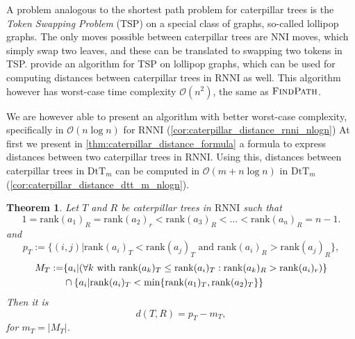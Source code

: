 \documentclass[11pt]{amsart}
\newtheorem{theorem}{Theorem}
\newcommand{\rnni}{\mathrm{RNNI}}
\newcommand{\findpath}{\textsc{FindPath}}
\newcommand{\rank}{\mathrm{rank}}
\newcommand{\nni}{\mathrm{NNI}}
\newcommand{\dtt}{\mathrm{DtT}}
\renewcommand{\O}{\mathcal O}
\begin{document}
A problem analogous to the shortest path problem for caterpillar trees is the \emph{Token Swapping Problem} (TSP) \autocite{Kawahara2017-ey} on a special class of graphs, so-called lollipop graphs.
The only moves possible between caterpillar trees are $\nni$ moves, which simply swap two leaves, and these can be translated to swapping two tokens in TSP.
\textcite{Kawahara2017-ey} provide an algorithm for TSP on lollipop graphs, which can be used for computing distances between caterpillar trees in $\rnni$ as well.
This algorithm however has worst-case time complexity $\O(n^2)$, the same as $\findpath$.

We are however able to present an algorithm with better worst-case complexity, specifically in $\O(n \log n)$ for $\rnni$ (\autoref{cor:caterpillar_distance_rnni_nlogn})
At first we present in \autoref{thm:caterpillar_distance_formula} a formula to express distances between two caterpillar trees in $\rnni$.
Using this, distances between caterpillar trees in $\dtt_m$ can be computed in $\O(m + n \log n)$ in $\dtt_m$ (\autoref{cor:caterpillar_distance_dtt_m_nlogn}).

\begin{theorem}
	Let $T$ and $R$ be caterpillar trees in $\rnni$ such that \[1 = \rank(a_1)_R = \rank(a_2)_r < \rank(a_3)_R < \ldots < \rank(a_n)_R = n-1.\]
	and
	\[p_T := \{(i,j)| \rank(a_i)_T < \rank(a_j)_T \text{ and } \rank(a_i)_R > \rank(a_j)_R\},\]
	\begin{align*}
		M_T := &\{a_i| (\forall k \textnormal{ with } \rank(a_k)_T \leq \rank(a_i)_T: \rank(a_k)_R > \rank(a_i)_r)\} \\
		& \cap \{a_i | \rank(a_i)_T < \min\{\rank(a_1)_T, \rank(a_2)_T\}\}
	\end{align*}
	Then it is
	\[d(T,R) = p_T - m_T,\]
	for ${m_T = |M_T|}$.

	\label{thm:caterpillar_distance_formula}
\end{theorem}
\end{document}
